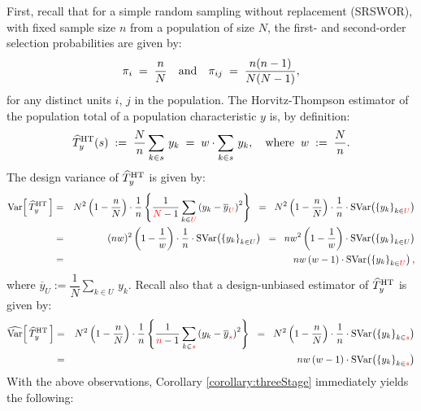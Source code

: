 First, recall that for a simple random sampling without replacement (SRSWOR),
with fixed sample size $n$ from a population of size $N$,
the first- and second-order selection probabilities are given by: 
\begin{equation*}
\pi_{i}\;=\;\dfrac{n}{N}
\quad\textnormal{and}\quad
\pi_{ij}\;=\;\dfrac{n(n-1)}{N(N-1)},
\end{equation*}
for any distinct units $i$, $j$ in the population.
The Horvitz-Thompson estimator of the population total of a population characteristic $y$ is, by definition:
\begin{equation*}
\widehat{T}^{\textnormal{HT}}_{y}(s)
\;:=\;\dfrac{N}{n}\sum_{k \in s}\,y_{k}
\;=\; w\cdot\sum_{k \in s}\,y_{k},
\quad\textnormal{where}\;\; w\;:=\;\dfrac{N}{n}.
\end{equation*}
The design variance of $\widehat{T}^{\textnormal{HT}}_{y}$ is given by:
\begin{eqnarray*}
\textnormal{Var}\!\left[\,\widehat{T}^{\textnormal{HT}}_{y}\,\right]
&=& N^{2}\left(1-\dfrac{n}{N}\right)\cdot\dfrac{1}{n}\left\{\dfrac{1}{{\color{red}N}-1}\sum_{k \in{\color{red}U}}\left(y_{k}-\overline{y}_{\color{red}U}\right)^{2}\right\}
\;\;=\;\; N^{2}\left(1-\dfrac{n}{N}\right)\cdot\dfrac{1}{n}\cdot\textnormal{SVar}\!\left(\left\{y_{k}\right\}_{k\in{\color{red}U}}\right) \\
&=& (nw)^{2}\left(1-\dfrac{1}{w}\right)\cdot\dfrac{1}{n}\cdot\textnormal{SVar}\!\left(\left\{y_{k}\right\}_{k\in U}\right)
\;\;=\;\; nw^{2}\left(1-\dfrac{1}{w}\right)\cdot\textnormal{SVar}\!\left(\left\{y_{k}\right\}_{k\in U}\right) \\
&=& nw\left(w-1\right)\cdot\textnormal{SVar}\!\left(\left\{y_{k}\right\}_{k\in{\color{red}U}}\right),
\end{eqnarray*}
where $\overline{y}_{U} := \dfrac{1}{N}\underset{k \in U}{\sum}\,y_{k}$.
Recall also that a design-unbiased estimator of $\widehat{T}^{\textnormal{HT}}_{y}$ is given by:
\begin{eqnarray*}
\widehat{\textnormal{Var}}\!\left[\,\widehat{T}^{\textnormal{HT}}_{y}\,\right]
&=& N^{2}\left(1-\dfrac{n}{N}\right)\cdot\dfrac{1}{n}\left\{\dfrac{1}{{\color{red}n}-1}\sum_{k \in{\color{red}s}}\left(y_{k}-\overline{y}_{\color{red}s}\right)^{2}\right\}
\;\;=\;\; N^{2}\left(1-\dfrac{n}{N}\right)\cdot\dfrac{1}{n}\cdot\textnormal{SVar}\!\left(\left\{y_{k}\right\}_{k\in{\color{red}s}}\right) \\
&=& nw\left(w-1\right)\cdot\textnormal{SVar}\!\left(\left\{y_{k}\right\}_{k\in{\color{red}s}}\right) \\
\end{eqnarray*}
With the above observations, Corollary \ref{corollary:threeStage} immediately yields the following:
